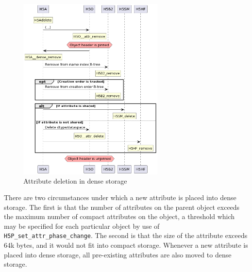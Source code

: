 \begin{figure}
    \centering
    \includegraphics[width=0.65\textwidth]{images/tour_3_uml_attr_remove_dense}
    \caption{Attribute deletion in dense storage}
    \label{fig:tour-3-uml-attr-remove-dense}
\end{figure}

There are two circumstances under which a new attribute is placed into dense storage. The first is that the number of attributes on the parent object exceeds the maximum number of compact attributes on the object, a threshold which may be specified for each particular object by use of \texttt{H5P\_set\_attr\_phase\_change}. The second is that the size of the attribute exceeds 64k bytes, and it would not fit into compact storage. Whenever a new attribute is placed into dense storage, all pre-existing attributes are also moved to dense storage. 

